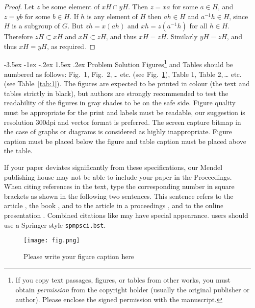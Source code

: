 \documentclass[a4paper,10pt]{article}
\makeatletter
\theoremstyle{definition}
\renewcommand\section{\@startsection {section}{1}{\z@}%
                                   {-3.5ex \@plus -1ex \@minus -.2ex}%
                                   {1.5ex \@plus.2ex}%
                                   {\large\bfseries}}
\makeatother
\begin{document}
\begin{proof}
Let $z$ be some element of $xH \cap yH$.  Then $z = xa$
for some $a \in H$, and $z = yb$ for some $b \in H$.
If $h$ is any element of $H$ then $ah \in H$ and
$a^{-1}h \in H$, since $H$ is a subgroup of $G$.
But $zh = x(ah)$ and $xh = z(a^{-1}h)$ for all $h \in H$.
Therefore $zH \subset xH$ and $xH \subset zH$, and thus
$xH = zH$.  Similarly $yH = zH$, and thus $xH = yH$,
as required.
\end{proof}

\section{Problem Solution}
Figures\footnote{If you copy text passages, figures, or tables from other works, you must obtain \textit{permission} from the copyright holder (usually the original publisher or author). Please enclose the signed permission with the manuscript.} and Tables should be numbered as follows: Fig.~1,
Fig.~2,\,\dots{} etc. (see Fig.~\ref{fig:1}), Table 1, Table 2,\,\dots{} etc. (see Table~\ref{tab:1}). The figures are expected to be printed in colour (the text and tables strictly in black), but authors are strongly recommended to test the readability of the figures in gray shades to be on the safe side. Figure quality must be appropriate for the print and labels must be readable, our suggestion is resolution 300dpi and vector format is preferred. The screen capture bitmap in the case of graphs or diagrams is considered as highly inappropriate. Figure caption must be placed below the figure and table caption must be placed above the table.

If your paper deviates significantly from these specifications, our Mendel publishing house may not be able to include your paper in the Proceedings. When citing references in the text, type the corresponding number in square brackets as shown in the following two sentences.
This sentence refers to the article \cite{article-full}, the book \cite{book-full}, and to the article
in a proceedings \cite{inproceedings-full}, and to the online presentation \cite{online-misc}.
Combined citations like \cite{article-full,book-full} may have special appearance. \BibTeX{} users should use a Springer \BibTeX{} style \texttt{spmpsci.bst}.

%
%
\begin{figure}[h]
\begin{center}
\texttt{[image: fig.png]}
\caption{Please write your figure caption here}
\label{fig:1}
\end{center}
\end{figure}
\end{document}
